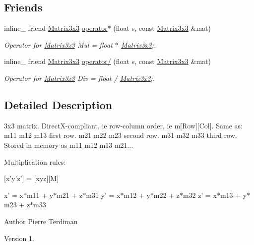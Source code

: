 \subsection*{Friends}
\begin{DoxyCompactItemize}
\item 
\hypertarget{class_matrix3x3_a54e4cff7dc37c73de3e3d0235ad36271}{inline\+\_\+ friend \hyperlink{class_matrix3x3}{Matrix3x3} \hyperlink{class_matrix3x3_a54e4cff7dc37c73de3e3d0235ad36271}{operator$\ast$} (float s, const \hyperlink{class_matrix3x3}{Matrix3x3} \&mat)}\label{class_matrix3x3_a54e4cff7dc37c73de3e3d0235ad36271}

\begin{DoxyCompactList}\small\item\em Operator for \hyperlink{class_matrix3x3}{Matrix3x3} Mul = float $\ast$ \hyperlink{class_matrix3x3}{Matrix3x3};. \end{DoxyCompactList}\item 
\hypertarget{class_matrix3x3_a639deffb8c0b2003b65c9e7ad3c5e907}{inline\+\_\+ friend \hyperlink{class_matrix3x3}{Matrix3x3} \hyperlink{class_matrix3x3_a639deffb8c0b2003b65c9e7ad3c5e907}{operator/} (float s, const \hyperlink{class_matrix3x3}{Matrix3x3} \&mat)}\label{class_matrix3x3_a639deffb8c0b2003b65c9e7ad3c5e907}

\begin{DoxyCompactList}\small\item\em Operator for \hyperlink{class_matrix3x3}{Matrix3x3} Div = float / \hyperlink{class_matrix3x3}{Matrix3x3};. \end{DoxyCompactList}\end{DoxyCompactItemize}


\subsection{Detailed Description}
3x3 matrix. Direct\+X-\/compliant, ie row-\/column order, ie m\mbox{[}Row\mbox{]}\mbox{[}Col\mbox{]}. Same as\+: m11 m12 m13 first row. m21 m22 m23 second row. m31 m32 m33 third row. Stored in memory as m11 m12 m13 m21...

Multiplication rules\+:

\mbox{[}x'y'z'\mbox{]} = \mbox{[}xyz\mbox{]}\mbox{[}M\mbox{]}

x' = x$\ast$m11 + y$\ast$m21 + z$\ast$m31 y' = x$\ast$m12 + y$\ast$m22 + z$\ast$m32 z' = x$\ast$m13 + y$\ast$m23 + z$\ast$m33

\begin{DoxyAuthor}{Author}
Pierre Terdiman 
\end{DoxyAuthor}
\begin{DoxyVersion}{Version}
1. 
\end{DoxyVersion}


